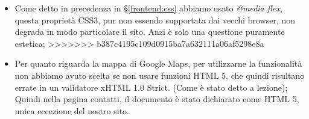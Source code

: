 \begin{itemize}
\item Come detto in precedenza in §\ref{frontend:css} abbiamo usato \textit{@media flex}, questa proprietà CSS3, pur non essendo supportata dai vecchi browser, non degrada in modo particolare il sito. Anzi è solo una questione puramente estetica;
>>>>>>> b387c4195c109d0915ba7a632111a06af5298e8a
\item Per quanto riguarda la mappa di Google Maps, per utilizzarne la funzionalità non abbiamo avuto scelta se non usare funzioni HTML 5, che quindi risultano errate in un validatore xHTML 1.0 Strict. (Come è stato detto a lezione);
Quindi nella pagina contatti, il documento è stato dichiarato come HTML 5, unica eccezione del nostro sito.
\end{itemize}

